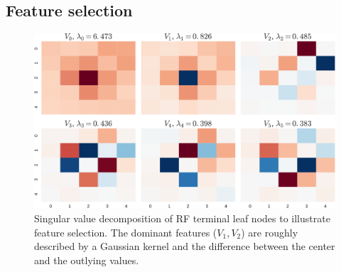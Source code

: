 \documentclass[landscape]{sciposter}
\newlength{\customfigwidth}
\begin{document}
\begin{multicols}{3}
\vfill \columnbreak

\section*{Feature selection}

\begin{figure}
    \center 
    \includegraphics[width=1.5\customfigwidth]{figures/avg_features-crop.pdf}%
\caption{
Singular value decomposition of RF terminal leaf nodes to illustrate feature selection. The dominant features ($V_1, V_2$) are roughly described by a Gaussian kernel and the difference between the center and the outlying values.
}
\end{figure}


\renewcommand{\refname}{} 

\small                     
 


%

\end{multicols}

 
\end{document}
